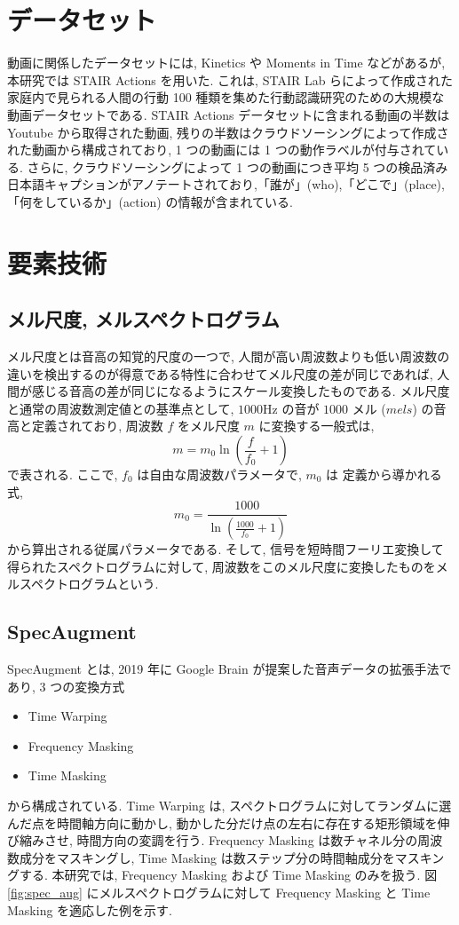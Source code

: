 \documentclass[twocolumn]{jarticle}     %
\begin{document}
\section{データセット}
動画に関係したデータセットには, Kinetics や Moments in Time などがあるが, 本研究では STAIR Actions \cite{yoshikawa2018stair} を用いた. これは, STAIR Lab らによって作成された家庭内で見られる人間の行動 100 種類を集めた行動認識研究のための大規模な動画データセットである. STAIR Actions データセットに含まれる動画の半数は Youtube から取得された動画, 残りの半数はクラウドソーシングによって作成された動画から構成されており, 1 つの動画には 1 つの動作ラベルが付与されている. さらに, クラウドソーシングによって 1 つの動画につき平均 5 つの検品済み日本語キャプションがアノテートされており,「誰が」(who),「どこで」(place),「何をしているか」(action) の情報が含まれている.


\section{要素技術}
\subsection{メル尺度, メルスペクトログラム}
メル尺度とは音高の知覚的尺度の一つで, 人間が高い周波数よりも低い周波数の違いを検出するのが得意である特性に合わせてメル尺度の差が同じであれば, 人間が感じる音高の差が同じになるようにスケール変換したものである. メル尺度と通常の周波数測定値との基準点として, $1000 \si{\hertz}$ の音が $1000$ メル ($mels$) の音高と定義されており, 周波数 $f$ をメル尺度 $m$ に変換する一般式は,
\begin{equation}
  m = m_{0}\ln(\frac{f}{f_{0}}+1)
\end{equation}
で表される. ここで, $f_{0}$ は自由な周波数パラメータで, $m_{0}$ は 定義から導かれる式,
\begin{equation}
  m_{0} = \frac{1000}{\ln(\frac{1000}{f_{0}} + 1)}
\end{equation}
から算出される従属パラメータである. そして, 信号を短時間フーリエ変換して得られたスペクトログラムに対して, 周波数をこのメル尺度に変換したものをメルスペクトログラムという.

\newpage
\subsection{SpecAugment}
SpecAugment \cite{Park_2019} とは, 2019 年に Google Brain が提案した音声データの拡張手法であり, 3 つの変換方式
\begin{itemize}
  \item Time Warping
  \item Frequency Masking
  \item Time Masking
\end{itemize}
から構成されている. Time Warping は, スペクトログラムに対してランダムに選んだ点を時間軸方向に動かし, 動かした分だけ点の左右に存在する矩形領域を伸び縮みさせ, 時間方向の変調を行う. Frequency Masking は数チャネル分の周波数成分をマスキングし, Time Masking は数ステップ分の時間軸成分をマスキングする.
本研究では, Frequency Masking および Time Masking のみを扱う. 図 \ref{fig:spec_aug} にメルスペクトログラムに対して Frequency Masking と Time Masking を適応した例を示す.
\end{document}
